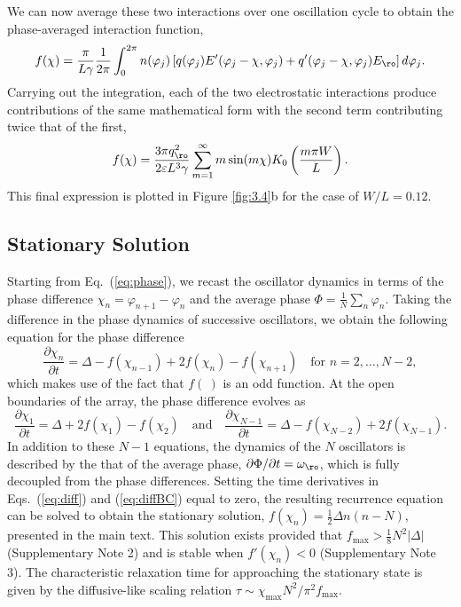 We can now average these two interactions over one oscillation cycle to obtain the phase-averaged interaction function,
\begin{equation}
    f(\chi) = \frac{\pi}{L\gamma}\frac{1}{2 \pi}\int_0^{2\pi} n(\varphi_j) \left[ q(\varphi_j) E'(\varphi_j-\chi,\varphi_j) + q'(\varphi_j-\chi,\varphi_j) E_{\ro} \right] d\varphi_j.
\end{equation}
Carrying out the integration, each of the two electrostatic interactions produce contributions of the same mathematical form with the second term contributing twice that of the first,
\begin{equation}
     f(\chi) = \frac{3\pi q_{\ro}^2}{2  \varepsilon L^3\gamma} \sum_{m=1}^{\infty} m \sin(m \chi)  K_0\left(\frac{m\pi W}{L}\right).
\end{equation}
This final expression is plotted in Figure \ref{fig:3.4}b for the case of $W/L=0.12$.


\subsection{Stationary Solution} 
Starting from Eq.~(\ref{eq:phase}), we recast the oscillator dynamics in terms of the phase difference $\chi_n=\varphi_{n+1} - \varphi_n$ and the average phase $\Phi=\tfrac{1}{N}\sum_n\varphi_n$.  Taking the difference in the phase dynamics of successive oscillators, we obtain the following equation for the phase difference 
\begin{equation}
    \frac{\partial \chi_n}{\partial t} = \Delta - f(\chi_{n-1}) + 2 f(\chi_n) - f(\chi_{n+1})\quad\text{for }n=2,\dots,N-2, \label{eq:diff}
\end{equation}
which makes use of the fact that $f(~)$ is an odd function.  At the open boundaries of the array, the phase difference evolves as
\begin{equation}
    \frac{\partial \chi_1}{\partial t} = \Delta + 2f(\chi_1) - f(\chi_2)\quad\text{and}\quad\frac{\partial \chi_{N-1}}{\partial t} = \Delta - f(\chi_{N-2}) + 2f(\chi_{N-1}). \label{eq:diffBC}
\end{equation}
In addition to these $N-1$ equations, the dynamics of the $N$ oscillators is described by the that of the average phase, $\partial \Phi /\partial t = \omega_{\ro}$, which is fully decoupled from the phase differences. Setting the time derivatives in Eqs.~(\ref{eq:diff}) and (\ref{eq:diffBC}) equal to zero, the resulting recurrence equation can be solved to obtain the stationary solution, $f(\chi_n) = \tfrac{1}{2}\Delta n(n-N)$, presented in the main text. This solution exists provided that $f_{\max}>\tfrac{1}{8}N^2\lvert\Delta\rvert$ (Supplementary Note 2) and is stable when $f'(\chi_n)<0$ (Supplementary Note 3). The characteristic relaxation time for approaching the stationary state is given by the diffusive-like scaling relation $\tau\sim \chi_{\max}N^2/\pi^2 f_{\max}$.


